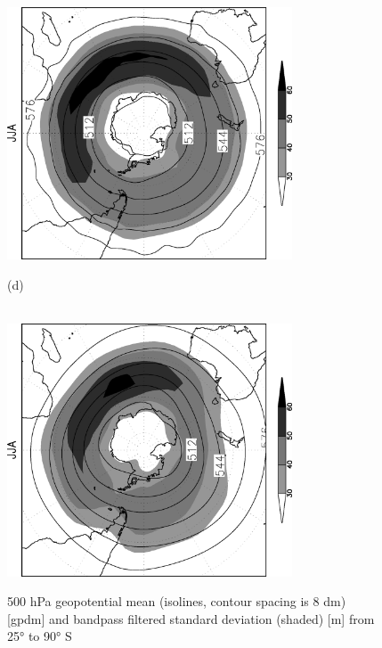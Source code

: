 \documentclass[12pt,a4paper,twoside,openright,headinclude,liststotoc,bibtotoc]{scrreprt}
\begin{document}
\begin{figure}[b]
{\includegraphics[height=7.5cm,angle=-90]
{eps/SHz500StdbpJJA.eps}
}
\parbox{8.5cm}{\hspace{0.02cm}\begin{scriptsize}(d)\end{scriptsize} \vspace{-0.3cm} \\
\includegraphics[height=7.5cm,angle=-90]
{eps/SHt21z500StdbpJJA.eps}
}
\caption[Southern Hemisphere 500 hPa geopotential mean and bandpass filtered standard deviation]{500 hPa geopotential mean (isolines, contour spacing is 8 dm) [gpdm] and bandpass filtered standard deviation (shaded) [m] from 25° to 90° S}
\label{img:z500S}
\end{figure}
\end{document}
